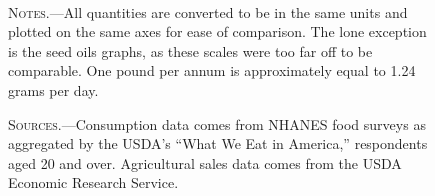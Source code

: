 \documentclass[12pt]{article}
\begin{document}
\begin{figure}[ht]
{    } \\
     \qquad
    
    \begin{minipage}{\textwidth}
    \bigskip
    
    \footnotesize
    \textsc{Notes.}---All quantities are converted to be in the same units and plotted on the same axes for ease of comparison. The lone exception is the seed oils graphs, as these scales were too far off to be comparable. One pound per annum is approximately equal to 1.24 grams per day.
    
    \bigskip
    \textsc{Sources.}---Consumption data comes from NHANES food surveys as aggregated by the USDA's ``What We Eat in America,'' respondents aged 20 and over. Agricultural sales data comes from the USDA Economic Research Service.
    \end{minipage}
\end{figure}
\end{document}

